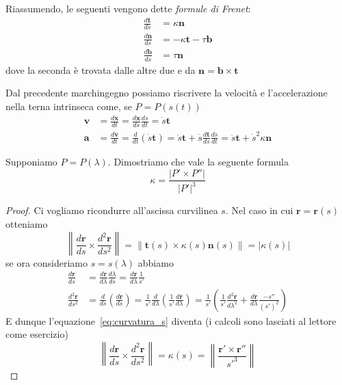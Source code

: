 Riassumendo, le seguenti vengono dette \emph{formule di Frenet}:
\begin{align*}
    \frac{d\mathbf{t} }{ds} &= \kappa \mathbf{n}  \\
    \frac{d\mathbf{n} }{ds} &= -\kappa \mathbf{t}  - \tau \mathbf{b}  \\
    \frac{d\mathbf{b} }{ds} &= \tau \mathbf{n}
\end{align*}
dove la seconda è trovata dalle altre due e da \(\mathbf{n} = \mathbf{b} \times
\mathbf{t} \) 

Dal precedente marchingegno possiamo riscrivere la velocità e l'accelerazione
nella terna intrinseca come, se \(P = P{(s{(t)})}\) 
\begin{align}\label{eq:velocita_accelerazione}
    \mathbf{v}  &= \frac{d\mathbf{x} }{dt} = \frac{d\mathbf{x} }{ds}
    \frac{ds}{dt} = \dot{s} \mathbf{t}\\
    \mathbf{a} &= \frac{d\mathbf{v} }{dt} = \frac{d}{dt} (\dot{s} \mathbf{t}) =
    \ddot{s} \mathbf{t} + \dot{s} \frac{d\mathbf{t} }{ds} \frac{ds}{dt} =
    \ddot{s} \mathbf{t} + \dot{s}^2 \kappa \mathbf{n}
\end{align}

\begin{example}
    Supponiamo \(P = P{(\lambda)}\). Dimostriamo che vale la seguente formula
    \[
        \kappa = \frac{|P' \times P''|}{|P'|^3}
    \]
    \begin{proof}
        Ci vogliamo ricondurre all'ascissa curvilinea \(s\). Nel caso in cui
        \(\mathbf{r} = \mathbf{r} {(s)}\) otteniamo
        \begin{equation}\label{eq:curvatura_s}
          \left\|\frac{d\mathbf{r} }{ds} \times  \frac{d^2\mathbf{r}
          }{ds^2}\right\| =
          \|\mathbf{t} {(s)} \times \kappa{(s)}\mathbf{n} {(s)}\| =
          |\kappa{(s)}|
        \end{equation}
        se ora consideriamo \(s = s{(\lambda)}\) abbiamo 
        \begin{align*}
            \frac{d\mathbf{r} }{ds} &= \frac{d\mathbf{r} }{d\lambda}
          \frac{d\lambda}{ds} = \frac{d\mathbf{r} }{d\lambda} \frac{1}{s'} \\
            \frac{d^2 \mathbf{r} }{ds^2} &= \frac{d}{ds} {\left(
            \frac{d\mathbf{r} }{ds} \right)} = \frac{1}{s'} \frac{d}{d\lambda}
            {\left( \frac{1}{s'} \frac{d\mathbf{r} }{d\lambda} \right)} =
            \frac{1}{s'} {\left( \frac{1}{s'} \frac{d^2\mathbf{r}
            }{d\lambda^2} + \frac{d\mathbf{r} }{d\lambda} \frac{-s''}{{(s')}^2} \right)} 
        \end{align*}
        E dunque l'equazione~\eqref{eq:curvatura_s} diventa (i calcoli sono
        lasciati al lettore come esercizio)
        \[
          \left\|\frac{d\mathbf{r} }{ds} \times  \frac{d^2 \mathbf{r}
          }{ds^2}\right\| =
          \kappa{(s)} = \left\| \frac{\mathbf{r} ' \times  \mathbf{r} ''
          }{s'^3}\right\|
        \]
    \end{proof}
\end{example}

